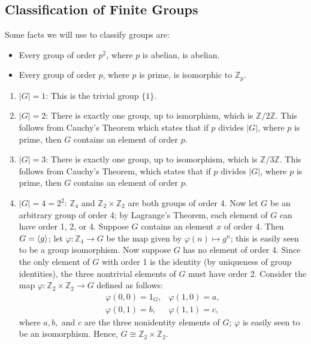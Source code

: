 \documentclass{article}
\begin{document}
\newpage 
\subsection{Classification of Finite Groups}
Some facts we will use to classify groups are: 
\begin{itemize}
	\item Every group of order $p^{2}$, where $p$ is abelian, is abelian. 
	\item Every group of order $p$, where $p$ is prime, is isomorphic to $\mathbb{Z}_{p}$. 
\end{itemize}
\begin{enumerate}[itemsep =-2pt,label = (\arabic{*})]
	\item $|G| = 1$: This is the trivial group $\{1\}$. 
	\item $|G| = 2$: There is exactly one group, up to ismorphism, which is $\mathbb{Z}/2\mathbb{Z}$. This follows from Cauchy's Theorem which states that if $p$ divides $|G|$, where $p$ is prime, then $G$ contains an element of order $p$. 
	\item $|G| = 3$: There is exactly one group, up to isomorphism, which is $\mathbb{Z}/3\mathbb{Z}$. This follows from Cauchy's Theorem, which states that if $p$ divides $|G|$, where $p$ is prime, then $G$ contains an element of order $p$. 
	\item $|G| = 4 = 2^{2}$: $\mathbb{Z}_{4}$ and $\mathbb{Z}_{2} \times \mathbb{Z}_{2}$ are both groups of order 4. Now let $G$ be an arbitrary group of order 4; by Lagrange's Theorem, each element of $G$ can have order 1, 2, or 4. Suppose $G$ contains an element $x$ of order 4. Then $G = \braket{g}$; let $\varphi: \mathbb{Z}_{4} \to G$ be the map given by $\varphi(n) \mapsto g^{n}$; this is easily seen to be a group isomorphism. Now suppose $G$ has no element of order 4. Since the only element of $G$ with order 1 is the identity (by uniqueness of group identities), the three nontrivial elements of $G$ must have order 2. Consider the map $\varphi: \mathbb{Z}_{2} \times \mathbb{Z}_{2} \to G$ defined as follows: 
		\begin{equation}
			\begin{matrix}
				\varphi(0,0) = 1_{G}, & \varphi(1, 0) = a, \\
				\varphi(0,1) = b, & \varphi(1,1) = c, 
			\end{matrix} 
		\end{equation}
	where $a, b,$ and $c$ are the three nonidentity elements of $G$; $\varphi$ is easily seen to be an isomorphism. Hence, $G \cong \mathbb{Z}_{2} \times \mathbb{Z}_{2}$. 

\end{enumerate}
\end{document}

